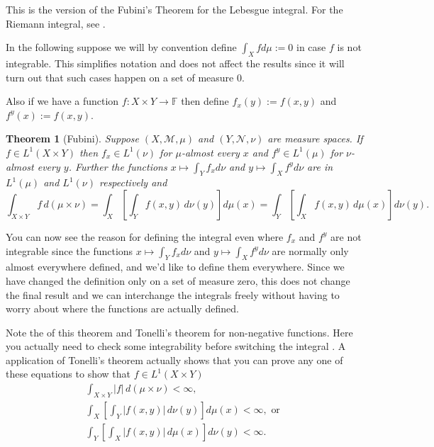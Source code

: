 \documentclass[12pt]{article}
\theoremstyle{theorem}
\newtheorem*{thm}{Theorem}
\theoremstyle{definition}
\begin{document}
This is the version of the Fubini's Theorem for the Lebesgue integral.  For
the Riemann integral, see .

In the following suppose we will by convention define $\int_X f d\mu := 0$ in case $f$
is not integrable.  This simplifies notation and does not affect the results since it will turn out that such cases happen on a set of measure 0.

Also if we have a function $f\colon X \times Y \to {\mathbb{F}}$ then define $f_x(y) := f(x,y)$ and $f^y(x) := f(x,y)$.

\begin{thm}[Fubini]
Suppose $(X,{\mathcal{M}},\mu)$ and $(Y,{\mathcal{N}},\nu)$ are 
measure spaces. If $f \in L^1(X \times Y)$
then $f_x \in L^1(\nu)$ for $\mu$-almost every $x$ and
$f^y \in L^1(\mu)$ for $\nu$-almost every $y$.  Further
the functions
$x \mapsto \int_Y f_x d\nu$ and $y \mapsto \int_X f^y d\nu$ are
in $L^1(\mu)$ and $L^1(\nu)$ respectively and
\begin{equation*}
\int_{X \times Y} f \, d(\mu \times \nu) =
\int_X \left[ \int_Y f(x,y) \,d\nu(y) \right] d\mu(x) =
\int_Y \left[ \int_X f(x,y) \,d\mu(x) \right] d\nu(y) .
\end{equation*}
\end{thm}

You can now see the reason for defining the integral even where $f_x$ and
$f^y$ are not integrable since the functions 
$x \mapsto \int_Y f_x d\nu$ and $y \mapsto \int_X f^y d\nu$
are normally only almost everywhere defined, and we'd like to define them everywhere.  Since we have changed the definition only on a set of measure
zero, this does not change the final result and we can interchange the
integrals freely without having to worry about where the functions are
actually defined.

Note the  of this theorem and Tonelli's theorem for non-negative functions.  Here you actually need to check some integrability before switching
the integral .  A  application of Tonelli's theorem actually shows that you can prove any one of these equations to show that $f \in L^1(X \times Y)$
\begin{gather*}
\int_{X \times Y} \lvert f \rvert \, d(\mu \times \nu) < \infty ,
\\
\int_X \left[ \int_Y \lvert f(x,y) \rvert \,d\nu(y) \right] d\mu(x) < \infty, \text{ or }
\\
\int_Y \left[ \int_X \lvert f(x,y) \rvert \,d\mu(x) \right] d\nu(y) < \infty .
\end{gather*}
\end{document}
